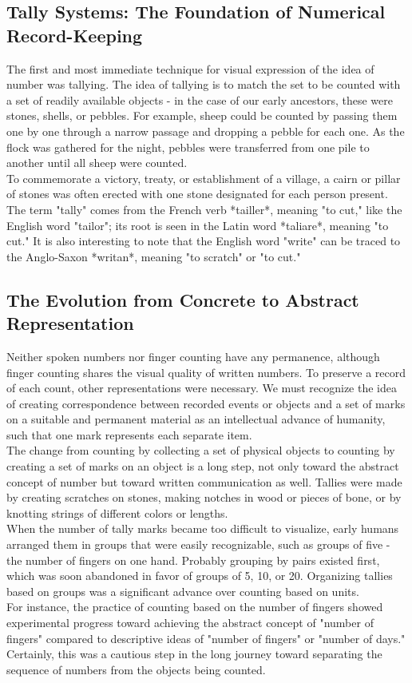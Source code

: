 \documentclass[12pt, oneside, openany]{book}
\begin{document}
\subsection{Tally Systems: The Foundation of Numerical Record-Keeping}

The first and most immediate technique for visual expression of the idea of number was tallying. The idea of tallying is to match the set to be counted with a set of readily available objects - in the case of our early ancestors, these were stones, shells, or pebbles. For example, sheep could be counted by passing them one by one through a narrow passage and dropping a pebble for each one. As the flock was gathered for the night, pebbles were transferred from one pile to another until all sheep were counted.\\
To commemorate a victory, treaty, or establishment of a village, a cairn or pillar of stones was often erected with one stone designated for each person present. The term "tally" comes from the French verb *tailler*, meaning "to cut," like the English word "tailor"; its root is seen in the Latin word *taliare*, meaning "to cut." It is also interesting to note that the English word "write" can be traced to the Anglo-Saxon *writan*, meaning "to scratch" or "to cut."
\subsection{The Evolution from Concrete to Abstract Representation}

Neither spoken numbers nor finger counting have any permanence, although finger counting shares the visual quality of written numbers. To preserve a record of each count, other representations were necessary. We must recognize the idea of creating correspondence between recorded events or objects and a set of marks on a suitable and permanent material as an intellectual advance of humanity, such that one mark represents each separate item.\\
The change from counting by collecting a set of physical objects to counting by creating a set of marks on an object is a long step, not only toward the abstract concept of number but toward written communication as well. Tallies were made by creating scratches on stones, making notches in wood or pieces of bone, or by knotting strings of different colors or lengths.\\
When the number of tally marks became too difficult to visualize, early humans arranged them in groups that were easily recognizable, such as groups of five - the number of fingers on one hand. Probably grouping by pairs existed first, which was soon abandoned in favor of groups of 5, 10, or 20. Organizing tallies based on groups was a significant advance over counting based on units.\\
For instance, the practice of counting based on the number of fingers showed experimental progress toward achieving the abstract concept of "number of fingers" compared to descriptive ideas of "number of fingers" or "number of days." Certainly, this was a cautious step in the long journey toward separating the sequence of numbers from the objects being counted.\\
\end{document}
